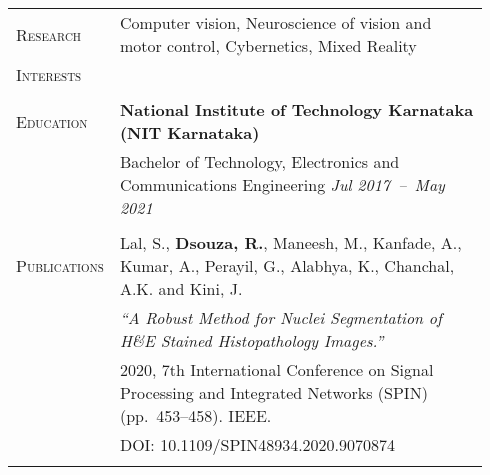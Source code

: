 \documentclass[letterpaper, 10pt, oneside]{article}
\newcommand{\stitle}[1]{\normalsize{\textsc{#1}}}
\begin{document}
\noindent \begin{longtable}{@{} p{0.14\linewidth} p{0.8\linewidth}}

\stitle{Research}  & Computer vision, Neuroscience of vision and motor control, Cybernetics, Mixed Reality \\
\stitle{Interests} & \\
\\


\stitle{Education} & \textbf{National Institute of Technology Karnataka (NIT Karnataka)} \\
                   & Bachelor of Technology, Electronics and Communications Engineering \hfill \hspace{-3em} \textit{Jul 2017\ --\ May 2021} \\
\\


\stitle{Publications} & Lal, S., \textbf{Dsouza, R.}, Maneesh, M., Kanfade, A., Kumar, A., Perayil, G., Alabhya, K., Chanchal, A.K. and Kini, J. \\
                      & \textit{``A Robust Method for Nuclei Segmentation of H\&E Stained Histopathology Images.''} \\
                      & 2020, 7th International Conference on Signal Processing and Integrated Networks (SPIN) (pp.~453--458)\@. IEEE\@.  \\
                      & \textcolor{dark-purple}{DOI\@: 10.1109/SPIN48934.2020.9070874} \\
\\



\end{longtable}
\end{document}
